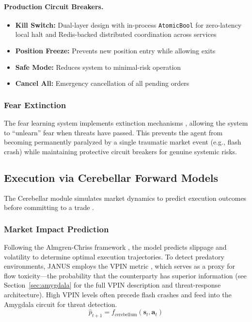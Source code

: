 \documentclass[12pt, a4paper]{article}
\begin{document}
\paragraph{Production Circuit Breakers.}
\begin{itemize}
	\item \textbf{Kill Switch:} Dual-layer design with in-process \texttt{AtomicBool} for zero-latency local halt and Redis-backed distributed coordination across services
	\item \textbf{Position Freeze:} Prevents new position entry while allowing exits
	\item \textbf{Safe Mode:} Reduces system to minimal-risk operation
	\item \textbf{Cancel All:} Emergency cancellation of all pending orders
\end{itemize}

\subsubsection{Fear Extinction}

The fear learning system implements extinction mechanisms \citep{monfils2009extinction, caligiore2019superlearning}, allowing the system to ``unlearn'' fear when threats have passed. This prevents the agent from becoming permanently paralyzed by a single traumatic market event (e.g., flash crash) while maintaining protective circuit breakers for genuine systemic risks.

\subsection{Execution via Cerebellar Forward Models}
\label{sec:cerebellum}

The Cerebellar module simulates market dynamics to predict execution outcomes before committing to a trade \citep{wolpert1998cerebellum, sokolov2017cerebellum}.

\subsubsection{Market Impact Prediction}

Following the Almgren-Chriss framework \citep{almgren2001optimal, markwick2023almgren}, the model predicts slippage and volatility to determine optimal execution trajectories.
To detect predatory environments, JANUS employs the VPIN metric \citep{easley2011vpin, easley2012flow}, which serves as a proxy for flow toxicity---the probability that the counterparty has superior information (see Section~\ref{sec:amygdala} for the full VPIN description and threat-response architecture).
High VPIN levels often precede flash crashes and feed into the Amygdala circuit for threat detection.
\begin{equation}
	\hat{p}_{t+1} = f_{\text{cerebellum}}(\mathbf{s}_t, \mathbf{a}_t)
	\label{eq:cerebellum_prediction}
\end{equation}
\end{document}
